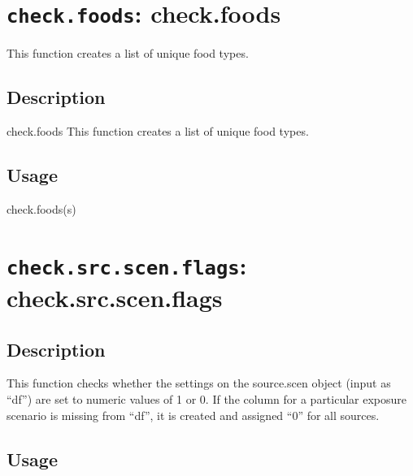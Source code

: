 \documentclass[
]{article}
\newenvironment{Shaded}{\begin{snugshade}}{\end{snugshade}}
\newcommand{\FunctionTok}[1]{\textcolor[rgb]{0.00,0.00,0.00}{#1}}
\newcommand{\NormalTok}[1]{#1}
\begin{document}
\hypertarget{check.foods-check.foods}{%
\section{\texorpdfstring{\texttt{check.foods}:
check.foods}{check.foods: check.foods}}\label{check.foods-check.foods}}

This function creates a list of unique food types.

\hypertarget{description-5}{%
\subsection{Description}\label{description-5}}

check.foods This function creates a list of unique food types.

\hypertarget{usage-5}{%
\subsection{Usage}\label{usage-5}}

\begin{Shaded}
\begin{Highlighting}[]
\FunctionTok{check.foods}\NormalTok{(s)}
\end{Highlighting}
\end{Shaded}

\hypertarget{check.src.scen.flags-check.src.scen.flags}{%
\section{\texorpdfstring{\texttt{check.src.scen.flags}:
check.src.scen.flags}{check.src.scen.flags: check.src.scen.flags}}\label{check.src.scen.flags-check.src.scen.flags}}

\hypertarget{description-6}{%
\subsection{Description}\label{description-6}}

This function checks whether the settings on the source.scen object
(input as ``df'') are set to numeric values of 1 or 0. If the column for
a particular exposure scenario is missing from ``df'', it is created and
assigned ``0'' for all sources.

\hypertarget{usage-6}{%
\subsection{Usage}\label{usage-6}}
\end{document}
